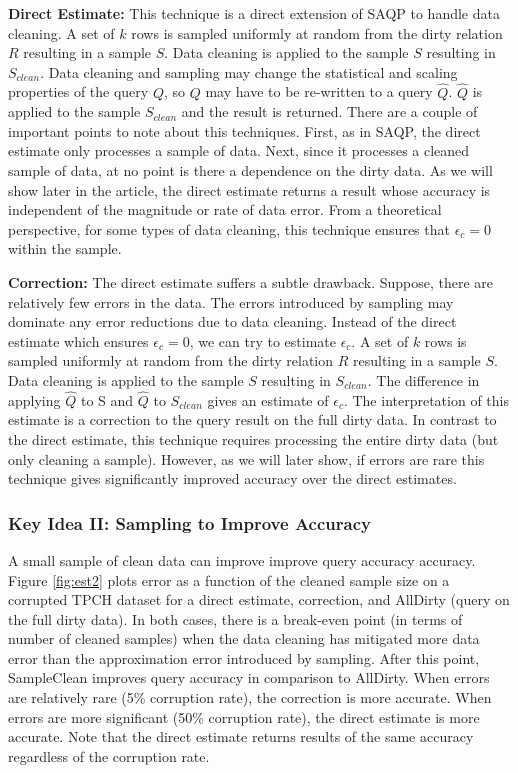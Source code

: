 \vspace{0.5em}
\noindent\textbf{Direct Estimate: } This technique is a direct extension of SAQP to handle data cleaning. A set of $k$ rows is sampled uniformly at random from the dirty relation $R$ resulting in a sample $S$. Data cleaning is applied to the sample $S$ resulting in $S_{clean}$.
Data cleaning and sampling may change the statistical and scaling properties of the query $Q$, so $Q$ may have to be re-written to a query $\widehat{Q}$. $\widehat{Q}$ is applied to the sample $S_{clean}$ and the result is returned. 
There are a couple of important points to note about this techniques.
First, as in SAQP, the direct estimate only processes a sample of data.
Next, since it processes a cleaned sample of data, at no point is there a dependence on the dirty data.
As we will show later in the article, the direct estimate returns a result whose accuracy is independent of the magnitude or rate of data error. 
From a theoretical perspective, for some types of data cleaning, this technique ensures that $\epsilon_c = 0$ within the sample.

\vspace{0.5em}
\noindent\textbf{Correction: } The direct estimate suffers a subtle drawback. Suppose, there are relatively few errors in the data. The errors introduced by sampling may dominate any error reductions due to data cleaning. Instead of the direct estimate which ensures $\epsilon_c = 0$, we can try to estimate $\epsilon_c$. A set of $k$ rows is sampled uniformly at random from the dirty relation $R$ resulting in a sample $S$. Data cleaning is applied to the sample $S$ resulting in $S_{clean}$. 
The difference in applying $\widehat{Q}$ to S and $\widehat{Q}$ to $S_{clean}$ gives an estimate of $\epsilon_c$. 
The interpretation of this estimate is a correction to the query result on the full dirty data.
In contrast to the direct estimate, this technique requires processing the entire dirty data (but only cleaning a sample).
However, as we will later show, if errors are rare this technique gives significantly improved accuracy over the direct estimates.

\iffalse
\subsubsection{Key Idea II: Sampling to Improve Accuracy}
A small sample of clean data can improve improve query accuracy accuracy.
Figure \ref{fig:est2} plots error as a function of the cleaned sample size on a corrupted TPCH dataset for a direct estimate, correction, and AllDirty (query on the full dirty data).
In both cases, there is a break-even point (in terms of number of cleaned samples) when the data cleaning has mitigated more data error than the approximation error introduced by sampling.
After this point, SampleClean improves query accuracy in comparison to AllDirty.
When errors are relatively rare (5\% corruption rate), the correction is more accurate. 
When errors are more significant (50\% corruption rate), the direct estimate is more accurate.
Note that the direct estimate returns results of the same accuracy regardless of the corruption rate. 


